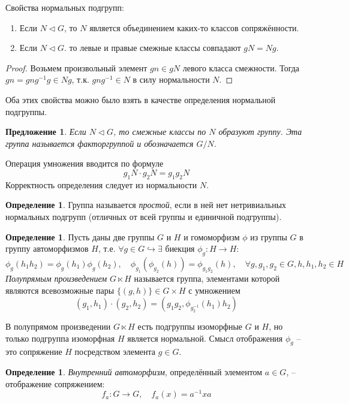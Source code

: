\documentclass[12pt]{article}
\newtheorem{predl}[theorem]{Предложение}
\theoremstyle{definition}
\newtheorem{defin}[theorem]{Определение}
\begin{document}
Свойства нормальных подгрупп:
\begin{enumerate}
    \item Если $N\lhd G$, то $N$ является объединением каких-то классов сопряжённости.
    \item Если $N\lhd G$. то левые и правые смежные классы совпадают $gN=Ng$.
\end{enumerate}
\begin{proof}
Возьмем произвольный элемент $gn\in gN$ левого класса смежности. Тогда $gn=gng^{-1}g\in Ng$, т.к. $gng^{-1}\in N$ в силу нормальности $N$.
\end{proof}
Оба этих свойства можно было взять в качестве определения нормальной подгруппы.
\begin{predl}
Если $N\lhd G$, то смежные классы по $N$ образуют группу. Эта группа называется \textit{факторгруппой} и обозначается $G/N$.
\end{predl}
Операция умножения вводится по формуле
\begin{equation}
    g_1N\cdot g_2N=g_1g_2N
\end{equation}
Корректность определения следует из нормальности $N$.
\begin{defin}
Группа называется \textit{простой}, если в ней нет нетривиальных нормальных подгрупп (отличных от всей группы и единичной подгруппы).
\end{defin}
\begin{defin}
    Пусть даны две группы $G$ и $H$ и гомоморфизм $\phi$ из группы $G$ в группу автоморфизмов $H$, т.е. $\forall g\in G\hookrightarrow\exists$ биекция $\phi_g:H\rightarrow H:$
    \begin{equation}
        \phi_g(h_1h_2)=\phi_g(h_1)\phi_g(h_2),\quad \phi_{g_1}(\phi_{g_2}(h))=\phi_{g_1g_2}(h),\quad\forall g,g_1,g_2\in G, h,h_1,h_2\in H
    \end{equation}
    \textit{Полупрямым произведением} $G\ltimes H$ называется группа, элементами которой являются всевозможные пары $\{(g,h)\}\in G\times H$ с умножением
    \begin{equation}
        (g_1,h_1)\cdot(g_2,h_2)=(g_1g_2,\phi_{g_2^{-1}}(h_1)h_2)
    \end{equation}
\end{defin}
В полупрямом произведении $G\ltimes H$ есть подгруппы изоморфные $G$ и $H$, но только подгруппа изоморфная $H$ является нормальной. Смысл отображения $\phi_g$ -- это сопряжение $H$ посредством элемента $g \in G$.
\begin{defin}
    \textit{Внутренний автоморфизм}, определённый элементом $a\in G$, -- отображение сопряжением:
    \begin{equation}
        f_a:G\rightarrow G,\quad f_a(x)=a^{-1}xa
    \end{equation}
\end{defin}
\end{document}
